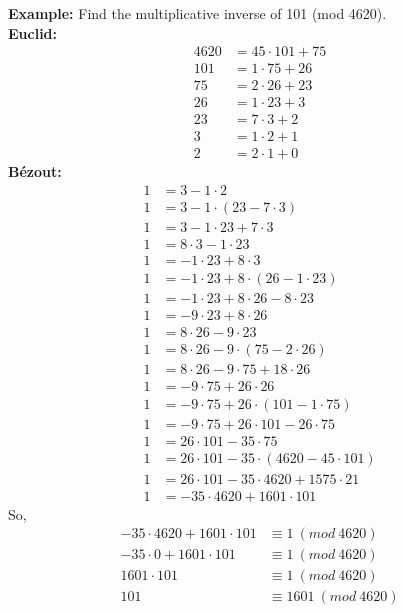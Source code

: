 \documentclass[openany]{report}
\begin{document}
\textbf{Example:} Find the multiplicative inverse of 101 (mod 4620).\\[2ex]
\textbf{Euclid:}
\begin{align*}
    4620 & = 45 \cdot 101 + 75\\
    101 &= 1 \cdot 75 + 26\\
    75 &= 2 \cdot 26 + 23\\
    26 &= 1 \cdot 23 + 3\\
    23 &= 7 \cdot 3 + 2\\
    3 &= 1 \cdot 2 + 1\\
    2 &= 2\cdot1 + 0
\end{align*}
\textbf{B\'ezout:}
\begin{align*}
    1 &= 3 - 1\cdot 2\\
    1 & = 3 - 1 \cdot (23 -  7 \cdot 3)\\
    1 & = 3 - 1\cdot 23 + 7\cdot 3\\
    1 &= 8\cdot 3  - 1\cdot 23\\
    1 &= -1 \cdot 23 + 8 \cdot 3\\
    1 &= -1 \cdot 23 + 8 \cdot (26 - 1 \cdot 23)\\
    1 &= -1 \cdot 23 + 8 \cdot 26 - 8 \cdot 23\\
    1 &= -9 \cdot 23 + 8\cdot 26\\
    1 &= 8 \cdot 26 - 9 \cdot 23\\
    1 &= 8 \cdot 26 - 9 \cdot (75 - 2 \cdot 26)\\
    1 & = 8 \cdot 26 - 9\cdot 75 + 18 \cdot 26\\
    1 &= -9 \cdot 75 + 26 \cdot 26\\
    1 &= -9 \cdot 75 + 26 \cdot (101 - 1 \cdot 75)\\
    1 &= -9 \cdot 75 + 26 \cdot 101 -26 \cdot 75\\
    1 &= 26 \cdot 101 - 35 \cdot 75\\
    1 &= 26 \cdot 101 - 35 \cdot (4620 - 45\cdot 101)\\
    1 &= 26\cdot 101 - 35 \cdot 4620 + 1575\cdot 21\\
    1 &= -35 \cdot 4620 + 1601 \cdot 101
\end{align*}
So,
\begin{align*}
    -35 \cdot 4620 + 1601 \cdot 101 &\equiv 1 \ (mod \ 4620)\\
    -35 \cdot 0 + 1601 \cdot 101 &\equiv 1 \ (mod \ 4620)\\
    1601 \cdot 101 &\equiv 1 \ (mod \ 4620)\\
    101 &\equiv 1601 \ (mod \ 4620)
\end{align*}
\end{document}
